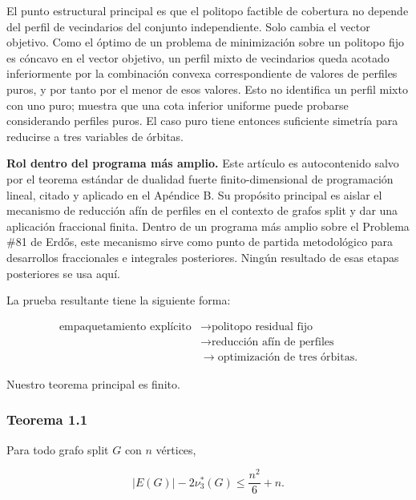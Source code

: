 \documentclass[
  11pt,
]{article}
\begin{document}
El punto estructural principal es que el politopo factible de cobertura
no depende del perfil de vecindarios del conjunto independiente. Solo
cambia el vector objetivo. Como el óptimo de un problema de minimización
sobre un politopo fijo es cóncavo en el vector objetivo, un perfil mixto
de vecindarios queda acotado inferiormente por la combinación convexa
correspondiente de valores de perfiles puros, y por tanto por el menor
de esos valores. Esto no identifica un perfil mixto con uno puro;
muestra que una cota inferior uniforme puede probarse considerando
perfiles puros. El caso puro tiene entonces suficiente simetría para
reducirse a tres variables de órbitas.

\textbf{Rol dentro del programa más amplio.} Este artículo es
autocontenido salvo por el teorema estándar de dualidad fuerte
finito-dimensional de programación lineal, citado y aplicado en el
Apéndice B. Su propósito principal es aislar el mecanismo de reducción
afín de perfiles en el contexto de grafos split y dar una aplicación
fraccional finita. Dentro de un programa más amplio sobre el Problema
\#81 de Erdős, este mecanismo sirve como punto de partida metodológico
para desarrollos fraccionales e integrales posteriores. Ningún resultado
de esas etapas posteriores se usa aquí.

La prueba resultante tiene la siguiente forma:

\[
\begin{aligned}
\text{empaquetamiento explícito}
&\longrightarrow
\text{politopo residual fijo}\\
&\longrightarrow
\text{reducción afín de perfiles}\\
&\longrightarrow
\text{optimización de tres órbitas}.
\end{aligned}
\]

Nuestro teorema principal es finito.

\subsubsection{Teorema 1.1}\label{teorema-1.1}

Para todo grafo split \(G\) con \(n\) vértices,

\[
|E(G)|-2\nu_3^*(G)
\le
\frac{n^2}{6}+n.
\]
\end{document}
